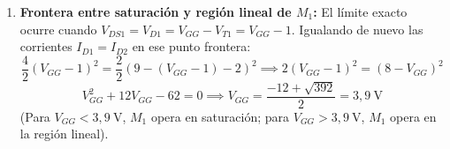 \begin{ejercicio}
\begin{enumerate}[label=\alph*)]
    \item \textbf{Frontera entre saturación y región lineal de $M_1$:}
    El límite exacto ocurre cuando $V_{DS1} = V_{D1} = V_{GG} - V_{T1} = V_{GG} - 1$. Igualando de nuevo las corrientes $I_{D1} = I_{D2}$ en ese punto frontera:
    \begin{equation}
        \frac{4}{2}(V_{GG} - 1)^2 = \frac{2}{2}\left(9 - (V_{GG} - 1) - 2\right)^2 \implies 2(V_{GG} - 1)^2 = (8 - V_{GG})^2
    \end{equation}
    \begin{equation}
        V_{GG}^2 + 12 V_{GG} - 62 = 0 \implies V_{GG} = \frac{-12 + \sqrt{392}}{2} = 3{,}9\ \si{\volt}
    \end{equation}
    (Para $V_{GG} < 3{,}9\ \si{\volt}$, $M_1$ opera en saturación; para $V_{GG} > 3{,}9\ \si{\volt}$, $M_1$ opera en la región lineal).
\end{enumerate}
\end{ejercicio}

